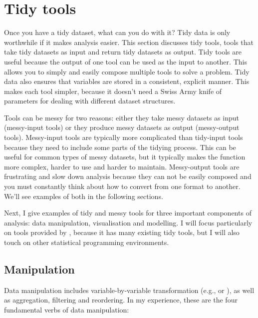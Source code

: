 \documentclass[article]{jss}
\begin{document}
\section{Tidy tools}
\label{sec:tidy-tools}

Once you have a tidy dataset, what can you do with it? Tidy data is only worthwhile if it makes analysis easier. This section discusses tidy tools, tools that take tidy datasets as input and return tidy datasets as output. Tidy tools are useful because the output of one tool can be used as the input to another. This allows you to simply and easily compose multiple tools to solve a problem. Tidy data also ensures that variables are stored in a consistent, explicit manner. This makes each tool simpler, because it doesn't need a Swiss Army knife of parameters for dealing with different dataset structures.

Tools can be messy for two reasons: either they take messy datasets as input (messy-input tools) or they produce messy datasets as output (messy-output tools). Messy-input tools are typically more complicated than tidy-input tools because they need to include some parts of the tidying process. This can be useful for common types of messy datasets, but it typically makes the function more complex, harder to use and harder to maintain. Messy-output tools are frustrating and slow down analysis because they can not be easily composed and you must constantly think about how to convert from one format to another. We'll see examples of both in the following sections.

Next, I give examples of tidy and messy tools for three important components of analysis: data manipulation, visualisation and modelling. I will focus particularly on tools provided by  \citep{R}, because it has many existing tidy tools, but I will also touch on other statistical programming environments.

\subsection{Manipulation}

Data manipulation includes variable-by-variable transformation (e.g.,  or ), as well as aggregation, filtering and reordering. In my experience, these are the four fundamental verbs of data manipulation:
\end{document}
